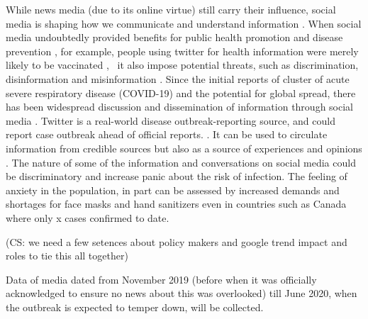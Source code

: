 While news media (due to its online virtue) still carry their influence, social media is shaping how we communicate and understand information \citep{LiuSieg19}.  When social media undoubtedly provided benefits for public health promotion and disease prevention \cite{BascHill20, SunYang20}, for example, people using twitter for health information were merely likely to be vaccinated \citep{AhmeQuin18},  it also impose potential threats, such as discrimination, disinformation and misinformation \citep{ChouOa18, McKevanS19}.  Since the initial reports of cluster of acute severe respiratory disease (COVID-19) and the potential for global spread, there has been widespread discussion and dissemination of information through social media \citep{?}.  Twitter is a real-world disease outbreak-reporting source, and could report case outbreak ahead of official reports. \citep{YoutDara19}.  It can be used to circulate information from credible sources but also as a source of experiences and opinions \citep{ChewEyes10}.  The nature of some of the information and conversations on social media could be discriminatory and increase panic about the risk of infection. The feeling of anxiety in the population, in part can be assessed by increased demands and shortages for face masks and hand sanitizers even in countries such as Canada where only x cases confirmed to date. 

(CS:  we need a few setences about policy makers and google trend impact and roles to tie this all together)




Data of media dated from November 2019 (before when it was officially acknowledged to ensure no news about this was overlooked) till June 2020, when the outbreak is expected to temper down, will be collected.  


